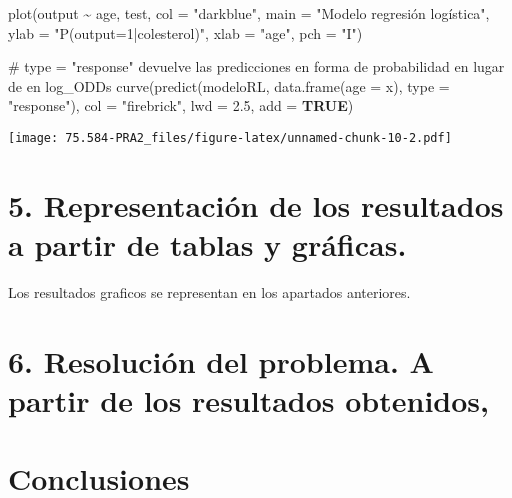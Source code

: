 \documentclass[
]{article}
\newenvironment{Shaded}{\begin{snugshade}}{\end{snugshade}}
\newcommand{\AttributeTok}[1]{\textcolor[rgb]{0.80,0.80,0.80}{#1}}
\newcommand{\CommentTok}[1]{\textcolor[rgb]{0.50,0.62,0.50}{#1}}
\newcommand{\ConstantTok}[1]{\textcolor[rgb]{0.86,0.64,0.64}{\textbf{#1}}}
\newcommand{\FloatTok}[1]{\textcolor[rgb]{0.75,0.75,0.82}{#1}}
\newcommand{\FunctionTok}[1]{\textcolor[rgb]{0.94,0.94,0.56}{#1}}
\newcommand{\NormalTok}[1]{\textcolor[rgb]{0.80,0.80,0.80}{#1}}
\newcommand{\SpecialCharTok}[1]{\textcolor[rgb]{0.86,0.64,0.64}{#1}}
\newcommand{\StringTok}[1]{\textcolor[rgb]{0.80,0.58,0.58}{#1}}
\begin{document}
\begin{Shaded}
\begin{Highlighting}[]
\FunctionTok{plot}\NormalTok{(output }\SpecialCharTok{\textasciitilde{}}\NormalTok{ age, test, }\AttributeTok{col =} \StringTok{"darkblue"}\NormalTok{,}
     \AttributeTok{main =} \StringTok{"Modelo regresión logística"}\NormalTok{,}
     \AttributeTok{ylab =} \StringTok{"P(output=1|colesterol)"}\NormalTok{,}
     \AttributeTok{xlab =} \StringTok{"age"}\NormalTok{, }\AttributeTok{pch =} \StringTok{"I"}\NormalTok{)}

\CommentTok{\# type = "response" devuelve las predicciones en forma de probabilidad en lugar de en log\_ODDs}
\FunctionTok{curve}\NormalTok{(}\FunctionTok{predict}\NormalTok{(modeloRL, }\FunctionTok{data.frame}\NormalTok{(}\AttributeTok{age =}\NormalTok{ x), }\AttributeTok{type =} \StringTok{"response"}\NormalTok{),}
      \AttributeTok{col =} \StringTok{"firebrick"}\NormalTok{, }\AttributeTok{lwd =} \FloatTok{2.5}\NormalTok{, }\AttributeTok{add =} \ConstantTok{TRUE}\NormalTok{)}
\end{Highlighting}
\end{Shaded}

\texttt{[image: 75.584-PRA2\_files/figure-latex/unnamed-chunk-10-2.pdf]}

\hypertarget{representaciuxf3n-de-los-resultados-a-partir-de-tablas-y-gruxe1ficas.}{%
\section{5. Representación de los resultados a partir de tablas y
gráficas.}\label{representaciuxf3n-de-los-resultados-a-partir-de-tablas-y-gruxe1ficas.}}

Los resultados graficos se representan en los apartados anteriores.

\hypertarget{resoluciuxf3n-del-problema.-a-partir-de-los-resultados-obtenidos}{%
\section{6. Resolución del problema. A partir de los resultados
obtenidos,}\label{resoluciuxf3n-del-problema.-a-partir-de-los-resultados-obtenidos}}

\hypertarget{conclusiones}{%
\section{Conclusiones}\label{conclusiones}}
\end{document}
